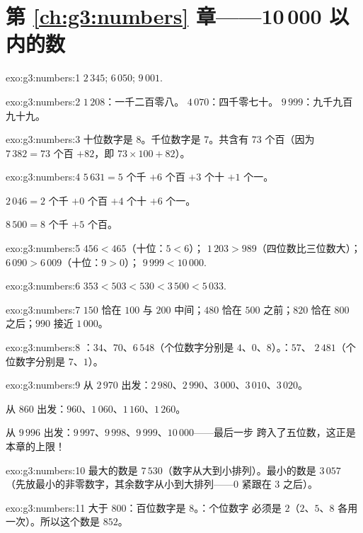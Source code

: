 \section*{第 \ref{ch:g3:numbers} 章——10\,000 以内的数}

\begin{solution}{exo:g3:numbers:1}
$2\,345$; \quad $6\,050$; \quad $9\,001$.
\end{solution}

\begin{solution}{exo:g3:numbers:2}
$1\,208$：一千二百零八。\quad
$4\,070$：四千零七十。\quad
$9\,999$：九千九百九十九。
\end{solution}

\begin{solution}{exo:g3:numbers:3}
十位数字是 $8$。千位数字是 $7$。共含有
$73$ 个百（因为 $7\,382 = 73$ 个百 $+ 82$，即
$73 \times 100 + 82$）。
\end{solution}

\begin{solution}{exo:g3:numbers:4}
$5\,631 = 5$ 个千 $+ 6$ 个百 $+ 3$ 个十 $+ 1$ 个一。

$2\,046 = 2$ 个千 $+ 0$ 个百 $+ 4$ 个十 $+ 6$ 个一。

$8\,500 = 8$ 个千 $+ 5$ 个百。
\end{solution}

\begin{solution}{exo:g3:numbers:5}
$456 < 465$（十位：$5 < 6$）；\quad
$1\,203 > 989$（四位数比三位数大）；\quad
$6\,090 > 6\,009$（十位：$9 > 0$）；\quad
$9\,999 < 10\,000$.
\end{solution}

\begin{solution}{exo:g3:numbers:6}
$353 < 503 < 530 < 3\,500 < 5\,033$.
\end{solution}

\begin{solution}{exo:g3:numbers:7}
$150$ 恰在 $100$ 与 $200$ 中间；$480$ 恰在
$500$ 之前；$820$ 恰在 $800$ 之后；$990$ 接近 $1\,000$。
\end{solution}

\begin{solution}{exo:g3:numbers:8}
：$34$、$70$、$6\,548$（个位数字分别是 $4$、$0$、$8$）。：$57$、
$2\,481$（个位数字分别是 $7$、$1$）。
\end{solution}

\begin{solution}{exo:g3:numbers:9}
从 $2\,970$ 出发：$2\,980$、$2\,990$、$3\,000$、$3\,010$、$3\,020$。

从 $860$ 出发：$960$、$1\,060$、$1\,160$、$1\,260$。

从 $9\,996$ 出发：$9\,997$、$9\,998$、$9\,999$、$10\,000$——最后一步
跨入了五位数，这正是本章的上限！
\end{solution}

\begin{solution}{exo:g3:numbers:10}
最大的数是 $7\,530$（数字从大到小排列）。最小的数是 $3\,057$
（先放最小的非零数字，其余数字从小到大排列——$0$
紧跟在 $3$ 之后）。
\end{solution}

\begin{solution}{exo:g3:numbers:11}
大于 $800$：百位数字是 $8$。：个位数字
必须是 $2$（$2$、$5$、$8$ 各用一次）。所以这个数是
$852$。
\end{solution}
